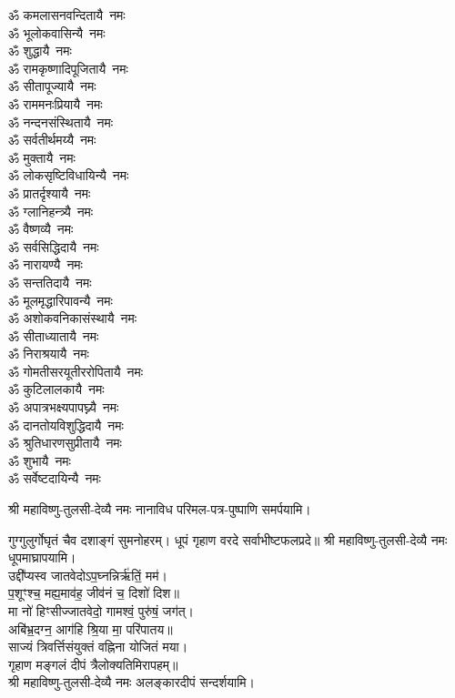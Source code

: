 \begin{multicols}{2}
\begin{flushleft}
ॐ कमलासनवन्दितायै~नमः\\
ॐ भूलोकवासिन्यै~नमः\\
ॐ शुद्धायै~नमः\\
ॐ रामकृष्णादिपूजितायै~नमः\\
ॐ सीतापूज्यायै~नमः\\
ॐ राममनःप्रियायै~नमः\\
ॐ नन्दनसंस्थितायै~नमः\\
ॐ सर्वतीर्थमय्यै~नमः\\
ॐ मुक्तायै~नमः\hfill{}‌\\
ॐ लोकसृष्टिविधायिन्यै~नमः\\
ॐ प्रातर्दृश्यायै~नमः\\
ॐ ग्लानिहन्त्र्यै~नमः\\
ॐ वैष्णव्यै~नमः\\
ॐ सर्वसिद्धिदायै~नमः\\
ॐ नारायण्यै~नमः\\
ॐ सन्ततिदायै~नमः\\
ॐ मूलमृद्धारिपावन्यै~नमः\\
ॐ अशोकवनिकासंस्थायै~नमः\\
ॐ सीताध्यातायै~नमः\hfill{}‌\\
ॐ निराश्रयायै~नमः\\
ॐ गोमतीसरयूतीररोपितायै~नमः\\
ॐ कुटिलालकायै~नमः\\
ॐ अपात्रभक्ष्यपापघ्न्यै~नमः\\
ॐ दानतोयविशुद्धिदायै~नमः\\
ॐ श्रुतिधारणसुप्रीतायै~नमः\\
ॐ शुभायै~नमः\\
ॐ सर्वेष्टदायिन्यै~नमः\hfill{}\\
\end{flushleft}
\end{multicols}
श्री महाविष्णु-तुलसी-देव्यै नमः नानाविध परिमल-पत्र-पुष्पाणि समर्पयामि।


गुग्गुलुर्गोघृतं चैव दशाङ्गं सुमनोहरम्।
धूपं गृहाण वरदे सर्वाभीष्टफलप्रदे॥
श्री महाविष्णु-तुलसी-देव्यै नमः धूपमाघ्रापयामि।\\

उद्दी᳚प्यस्व जातवेदोऽप॒घ्नन्निर्ऋ॑तिं॒ मम॑।\\
 प॒शूꣳश्च॒ मह्य॒माव॑ह॒ जीव॑नं च॒ दिशो॑ दिश॥ \\
मा नो॑ हिꣳसीज्जातवेदो॒ गामश्वं॒ पुरु॑षं॒ जग॑त्।\\
अबि॑भ्र॒दग्न॒ आग॑हि श्रि॒या मा॒ परि॑पातय॥ \\
साज्यं त्रिवर्त्तिसंयुक्तं वह्निना योजितं मया।\\
गृहाण मङ्गलं दीपं त्रैलोक्यतिमिरापहम्॥ \\
श्री महाविष्णु-तुलसी-देव्यै नमः अलङ्कारदीपं सन्दर्शयामि।\\

